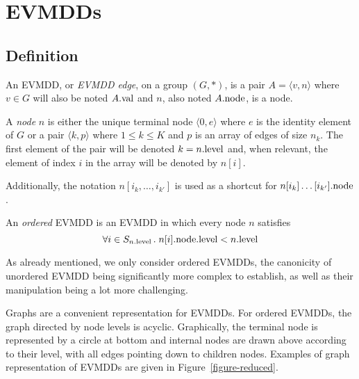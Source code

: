 \documentclass[a4paper,oneside,11pt,pdftex]{llncs}
\newcommand{\edge}[2]{\langle #1, #2 \rangle}
\newcommand{\val}[1]{#1{\rm .val}}
\newcommand{\node}[1]{#1{\rm .node}}
\newcommand{\level}[1]{#1{\rm .level}}
\begin{document}
\section{EVMDDs}

\subsection{Definition%
  \label{subsection-definition}}

\begin{definition}{\rm  \label{DEF:evmdd}}
An EVMDD, or \emph{EVMDD edge}, on a group $(G, *)$, is a pair $A = \edge{v}{n}$ where $v \in G$ will also 
be noted $\val{A}$ and $n$, also noted $\node{A}$, is a node. 

A \emph{node} $n$ is either the unique terminal node $\langle 0, e \rangle$ where $e$ is the identity element of 
$G$ or a pair $\langle k, p \rangle$ where $1 \leq k \leq K$ and $p$ is an array of edges of size $n_k$. 
The first element of the pair will be denoted $k=\level{n}$ and, when relevant, the element of index $i$ in the array will be denoted by $n[i]$.
\end{definition}

Additionally, the notation $n[i_k, \ldots, i_{k'}]$ is used as a shortcut for
$\node{n[i_k]\ldots[i_{k'}]}$.

\begin{definition}
An \emph{ordered} EVMDD is an EVMDD in which every node $n$ satisfies
$$
\forall i \in S_{\level{n}}\,.\; \level{\node{n[i]}} < \level{n}
$$
\end{definition}

As already mentioned, we only consider ordered EVMDDs, 
the canonicity of unordered EVMDD being significantly more complex to establish,
as well as their manipulation being a lot more challenging.

\begin{example}
Graphs are a convenient representation for EVMDDs.
For ordered EVMDDs, the graph directed by node levels is acyclic.
Graphically, the terminal node is represented
by a circle at bottom and internal nodes are drawn above according
to their level, with all edges pointing down to children nodes.
Examples of graph representation of EVMDDs are given in Figure~\vref{figure-reduced}.
\end{example}
\end{document}
